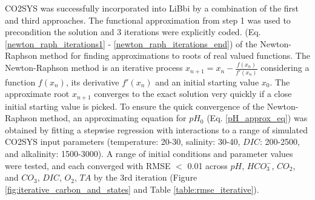 \documentclass{ruthesis}
\begin{document}
CO2SYS was successfully incorporated into LiBbi  by a combination of the first and third approaches.  The functional approximation from step 1 was used to precondition the solution and 3 iterations were explicitly coded.  (Eq. \ref{newton_raph_iterations1} - \ref{newton_raph_iterations_end}) of the Newton-Raphson method for finding approximations to roots of real valued functions. The Newton-Raphson method is an iterative process 
$ x_{n+1} = x_n - \frac{f(x_n)}{f'(x_n)} $
considering a function $f(x_n)$, its derivative $f'(x_n)$ and an initial starting value $x_0$. The approximate root $x_{n+1}$ converges to the exact solution very quickly if a close initial starting value is picked. To ensure the quick convergence of the Newton-Raphson method, an approximating equation for $pH_0$ (Eq. \ref{pH_approx_eq}) was obtained by fitting a stepwise regression with interactions to a range of simulated CO2SYS input parameters (temperature: 20-30, salinity: 30-40, $DIC$: 200-2500, and alkalinity: 1500-3000). A range of initial conditions and parameter values were tested, and each converged with RMSE $<$ 0.01 across $pH$, $HCO_3^-$, $CO_2$, and $CO_3$, $DIC$, $O_2$, $TA$ by the 3rd iteration (Figure \ref{fig:iterative_carbon_and_states} and Table \ref{table:rmse_iterative}).







\end{document}
